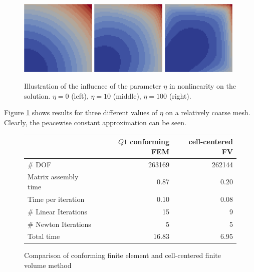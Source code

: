 \documentclass[a4paper,12pt]{article}
\begin{document}
\begin{figure}
\begin{center}
\includegraphics[width=0.32\textwidth]{eta0}\hfill
\includegraphics[width=0.32\textwidth]{eta10}\hfill
\includegraphics[width=0.32\textwidth]{eta100}
\end{center}
\caption{Illustration of the influence of the parameter $\eta$
in nonlinearity on the solution. $\eta=0$ (left), $\eta=10$ (middle), $\eta=100$ (right).}
\label{fig:Bunt}
\end{figure}

Figure \ref{fig:Bunt} shows results for three different values of $\eta$ on a relatively
coarse mesh. Clearly, the peacewise constant approximation can be seen.

\begin{figure}
\caption{Comparison of conforming finite element and cell-centered finite volume
method}
\label{fig:Compare}
\begin{center}
\begin{tabular}{l|r|r}
 & \multicolumn{1}{r|}{$Q1$ conforming FEM} & \multicolumn{1}{r}{cell-centered FV} \\
 \hline
 \# DOF & 263169 & 262144 \\
 Matrix assembly time & 0.87 & 0.20 \\
 Time per iteration & 0.10 & 0.08 \\
 \# Linear Iterations & 15 & 9 \\
 \# Newton Iterations & 5 & 5 \\
 Total time & 16.83 & 6.95 
\end{tabular}
\end{center}
\end{figure}
\end{document}
